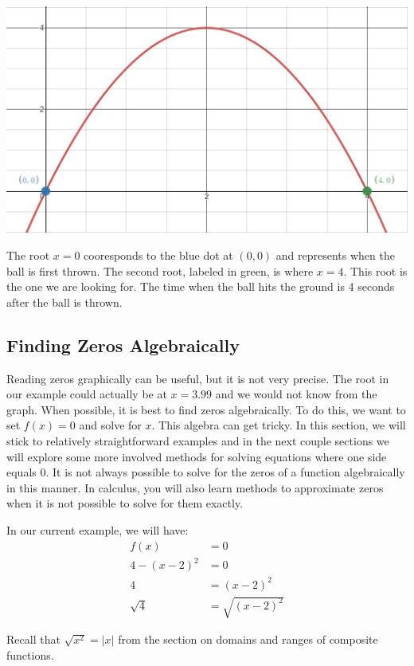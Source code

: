 \documentclass[nooutcomes]{ximera}
\begin{document}
\begin{example}
\begin{explanation}
\begin{image}
\includegraphics[width=.8\textwidth]{Zeros-BouncingBall8}
\end{image}

The root $x=0$ cooresponds to the blue dot at $(0,0)$ and represents when the ball is first thrown.  The second root, labeled in green, is where $x=4$.  This root is the one we are looking for.  The time when the ball hits the ground is 4 seconds after the ball is thrown.

\subsection{Finding Zeros Algebraically}

Reading zeros graphically can be useful, but it is not very precise.  The root in our example could actually be at $x=3.99$ and we would not know from the graph.  When possible, it is best to find zeros algebraically.  To do this, we want to set $f(x)=0$ and solve for $x$.  This algebra can get tricky.  In this section, we will stick to relatively straightforward examples and in the next couple sections we will explore some more involved methods for solving equations where one side equals 0.  It is not always possible to solve for the zeros of a function algebraically in this manner.  In calculus, you will also learn methods to approximate zeros when it is not possible to solve for them exactly.

In our current example, we will have:
\begin{align*}
f(x)&=0\\
4-(x-2)^2&=0 \\
4&=(x-2)^2 \\
 \sqrt{4}&=\sqrt{(x-2)^2}
\end{align*}  

Recall that $\sqrt{x^2}=|x|$ from the section on domains and ranges of composite functions.


\end{explanation}
\end{example}
\end{document}
